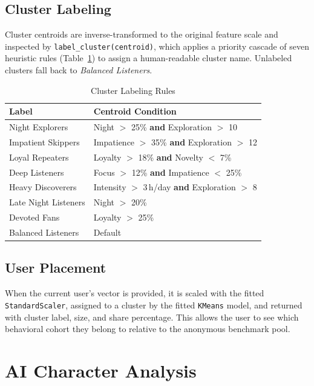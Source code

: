 \documentclass[conference]{IEEEtran}
\begin{document}
\subsection{Cluster Labeling}

Cluster centroids are inverse-transformed to the original feature scale and
inspected by \texttt{label\_cluster(centroid)}, which applies a priority
cascade of seven heuristic rules (Table~\ref{tab:clabels}) to assign a
human-readable cluster name. Unlabeled clusters fall back to
\textit{Balanced Listeners}.

\begin{table}[ht]
\caption{Cluster Labeling Rules}
\label{tab:clabels}
\centering
\renewcommand{\arraystretch}{1.1}
\begin{tabular}{ll}
\toprule
\textbf{Label} & \textbf{Centroid Condition} \\
\midrule
Night Explorers     & Night $>$ 25\% \textbf{and} Exploration $>$ 10 \\
Impatient Skippers  & Impatience $>$ 35\% \textbf{and} Exploration $>$ 12 \\
Loyal Repeaters     & Loyalty $>$ 18\% \textbf{and} Novelty $<$ 7\% \\
Deep Listeners      & Focus $>$ 12\% \textbf{and} Impatience $<$ 25\% \\
Heavy Discoverers   & Intensity $>$ 3\,h/day \textbf{and} Exploration $>$ 8 \\
Late Night Listeners & Night $>$ 20\% \\
Devoted Fans        & Loyalty $>$ 25\% \\
Balanced Listeners  & Default \\
\bottomrule
\end{tabular}
\end{table}

\subsection{User Placement}

When the current user's vector is provided, it is scaled with the fitted
\texttt{StandardScaler}, assigned to a cluster by the fitted
\texttt{KMeans} model, and returned with cluster label, size, and share
percentage. This allows the user to see which behavioral cohort they
belong to relative to the anonymous benchmark pool.

\section{AI Character Analysis}
\end{document}

